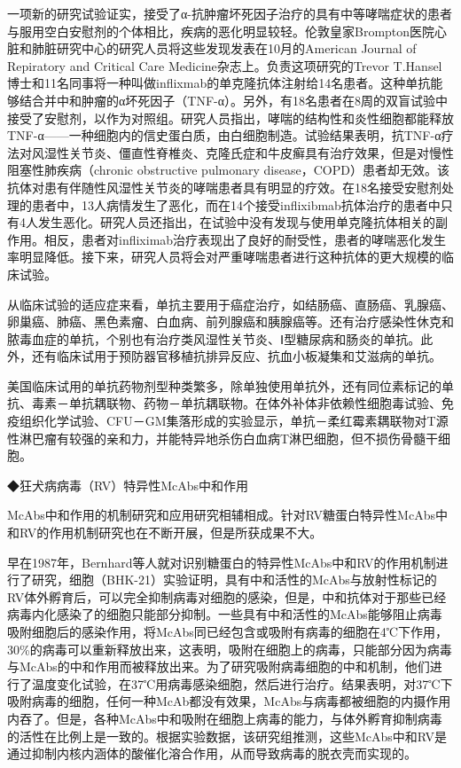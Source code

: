 一项新的研究试验证实，接受了α-抗肿瘤坏死因子治疗的具有中等哮喘症状的患者与服用空白安慰剂的个体相比，疾病的恶化明显较轻。伦敦皇家Brompton医院心脏和肺脏研究中心的研究人员将这些发现发表在10月的American
Journal of Repiratory and Critical Care
Medicine杂志上。负责这项研究的Trevor
T.Hansel博士和11名同事将一种叫做inflixmab的单克隆抗体注射给14名患者。这种单抗能够结合并中和肿瘤的α坏死因子（TNF-α）。另外，有18名患者在8周的双盲试验中接受了安慰剂，以作为对照组。研究人员指出，哮喘的结构性和炎性细胞都能释放TNF-α------一种细胞内的信史蛋白质，由白细胞制造。试验结果表明，抗TNF-α疗法对风湿性关节炎、僵直性脊椎炎、克隆氏症和牛皮癣具有治疗效果，但是对慢性阻塞性肺疾病（chronic
obstructive pulmonary
disease，COPD）患者却无效。该抗体对患有伴随性风湿性关节炎的哮喘患者具有明显的疗效。在18名接受安慰剂处理的患者中，13人病情发生了恶化，而在14个接受inflixibmab抗体治疗的患者中只有4人发生恶化。研究人员还指出，在试验中没有发现与使用单克隆抗体相关的副作用。相反，患者对infliximab治疗表现出了良好的耐受性，患者的哮喘恶化发生率明显降低。接下来，研究人员将会对严重哮喘患者进行这种抗体的更大规模的临床试验。

从临床试验的适应症来看，单抗主要用于癌症治疗，如结肠癌、直肠癌、乳腺癌、卵巢癌、肺癌、黑色素瘤、白血病、前列腺癌和胰腺癌等。还有治疗感染性休克和脓毒血症的单抗，个别也有治疗类风湿性关节炎、Ⅰ型糖尿病和肠炎的单抗。此外，还有临床试用于预防器官移植抗排异反应、抗血小板凝集和艾滋病的单抗。

美国临床试用的单抗药物剂型种类繁多，除单独使用单抗外，还有同位素标记的单抗、毒素－单抗耦联物、药物－单抗耦联物。在体外补体非依赖性细胞毒试验、免疫组织化学试验、CFU－GM集落形成的实验显示，单抗－柔红霉素耦联物对T源性淋巴瘤有较强的亲和力，并能特异地杀伤白血病T淋巴细胞，但不损伤骨髓干细胞。

◆狂犬病病毒（RV）特异性McAbs中和作用

McAbs中和作用的机制研究和应用研究相辅相成。针对RV糖蛋白特异性McAbs中和RV的作用机制研究也在不断开展，但是所获成果不大。

早在1987年，Bernhard等人就对识别糖蛋白的特异性McAbs中和RV的作用机制进行了研究，细胞（BHK-21）实验证明，具有中和活性的McAbs与放射性标记的RV体外孵育后，可以完全抑制病毒对细胞的感染，但是，中和抗体对于那些已经病毒内化感染了的细胞只能部分抑制。一些具有中和活性的McAbs能够阻止病毒吸附细胞后的感染作用，将McAbs同已经包含或吸附有病毒的细胞在4℃下作用，30\%的病毒可以重新释放出来，这表明，吸附在细胞上的病毒，只能部分因为病毒与McAbs的中和作用而被释放出来。为了研究吸附病毒细胞的中和机制，他们进行了温度变化试验，在37℃用病毒感染细胞，然后进行治疗。结果表明，对37℃下吸附病毒的细胞，任何一种McAb都没有效果，McAbs与病毒都被细胞的内摄作用内吞了。但是，各种McAbs中和吸附在细胞上病毒的能力，与体外孵育抑制病毒的活性在比例上是一致的。根据实验数据，该研究组推测，这些McAbs中和RV是通过抑制内核内涵体的酸催化溶合作用，从而导致病毒的脱衣壳而实现的。

